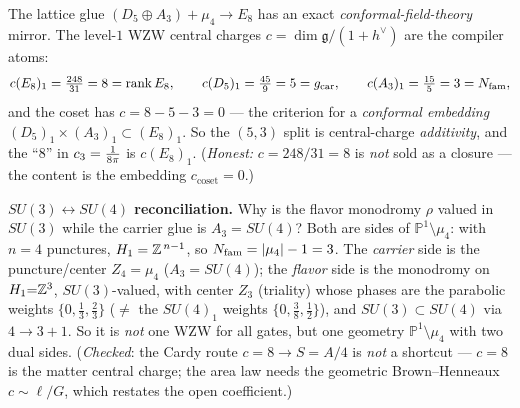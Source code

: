 \begin{winbox}[The boundary-CFT mirror: central charges $=$ compiler atoms \mE\ (\veri{v61\_cft\_bridge.py})]
The lattice glue $(D_5{\oplus}A_3){+}\mu_4\to E_8$ has an exact \emph{conformal-field-theory} mirror. The
level-$1$ WZW central charges $c=\dim\mathfrak g/(1{+}h^\vee)$ are the compiler atoms:
\[
  c(E_8)_1=\tfrac{248}{31}=8=\operatorname{rank}E_8,\qquad c(D_5)_1=\tfrac{45}{9}=5=g_{\mathrm{car}},\qquad c(A_3)_1=\tfrac{15}{5}=3=N_{\mathrm{fam}},
\]
and the coset has $c=8-5-3=0$ --- the criterion for a \emph{conformal embedding}
$(D_5)_1{\times}(A_3)_1\subset(E_8)_1$. So the $(5,3)$ split is central-charge \emph{additivity}, and the
``$8$'' in $c_3=\tfrac1{8\pi}$ is $c(E_8)_1$. (\emph{Honest:} $c=248/31{=}8$ is \emph{not} sold as a
closure --- the content is the embedding $c_{\mathrm{coset}}{=}0$.)

\textbf{$SU(3)\leftrightarrow SU(4)$ reconciliation.} Why is the flavor monodromy $\rho$ valued in $SU(3)$
while the carrier glue is $A_3{=}SU(4)$? Both are sides of $\mathbb P^1\setminus\mu_4$: with $n{=}4$ punctures,
$H_1=\mathbb Z^{\,n-1}$, so $N_{\mathrm{fam}}=|\mu_4|-1=3$. The \emph{carrier} side is the puncture/center $Z_4{=}\mu_4$
($A_3{=}SU(4)$); the \emph{flavor} side is the monodromy on $H_1{=}\mathbb Z^3$, $SU(3)$-valued, with center
$Z_3$ (triality) whose phases are the parabolic weights $\{0,\tfrac13,\tfrac23\}$ ($\neq$ the $SU(4)_1$
weights $\{0,\tfrac38,\tfrac12\}$), and $SU(3)\subset SU(4)$ via $4\to3{+}1$. So it is \emph{not} one WZW for
all gates, but one geometry $\mathbb P^1\setminus\mu_4$ with two dual sides. (\emph{Checked}: the Cardy route
$c{=}8\to S{=}A/4$ is \emph{not} a shortcut --- $c{=}8$ is the matter central charge; the area law needs the
geometric Brown--Henneaux $c\sim\ell/G$, which restates the open coefficient.)
\end{winbox}


